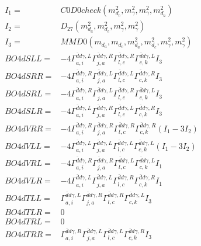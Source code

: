 \documentclass[A4,landscape]{article}
\begin{document}
\begin{align} 
I_1 = & C0D0check(m^2_{d_{{c}}}, m^2_{\gamma}, m^2_{\gamma}, m^2_{d_{{a}}}) \\ 
I_2 = & D_{27}(m^2_{d_{{a}}}, m^2_{d_{{c}}}, m^2_{\gamma}, m^2_{\gamma}) \\ 
I_3 = & MMD0(m_{d_{{a}}}, m_{d_{{c}}}, m^2_{d_{{a}}}, m^2_{d_{{c}}}, m^2_{\gamma}, m^2_{\gamma}) \\ 
  BO4dSLL= & -4  \Gamma^{\bar{d}d \gamma ,L}_{a, i} \Gamma^{\bar{d}d \gamma ,R}_{j, a} \Gamma^{\bar{d}d \gamma ,R}_{l, c} \Gamma^{\bar{d}d \gamma ,L}_{c, k} I_3 \\ 
  BO4dSRR= & -4  \Gamma^{\bar{d}d \gamma ,R}_{a, i} \Gamma^{\bar{d}d \gamma ,L}_{j, a} \Gamma^{\bar{d}d \gamma ,L}_{l, c} \Gamma^{\bar{d}d \gamma ,R}_{c, k} I_3 \\ 
  BO4dSRL= & -4  \Gamma^{\bar{d}d \gamma ,R}_{a, i} \Gamma^{\bar{d}d \gamma ,L}_{j, a} \Gamma^{\bar{d}d \gamma ,R}_{l, c} \Gamma^{\bar{d}d \gamma ,L}_{c, k} I_3 \\ 
  BO4dSLR= & -4  \Gamma^{\bar{d}d \gamma ,L}_{a, i} \Gamma^{\bar{d}d \gamma ,R}_{j, a} \Gamma^{\bar{d}d \gamma ,L}_{l, c} \Gamma^{\bar{d}d \gamma ,R}_{c, k} I_3 \\ 
  BO4dVRR= & -4  \Gamma^{\bar{d}d \gamma ,R}_{a, i} \Gamma^{\bar{d}d \gamma ,R}_{j, a} \Gamma^{\bar{d}d \gamma ,R}_{l, c} \Gamma^{\bar{d}d \gamma ,R}_{c, k} (I_1 - 3 I_2) \\ 
  BO4dVLL= & -4  \Gamma^{\bar{d}d \gamma ,L}_{a, i} \Gamma^{\bar{d}d \gamma ,L}_{j, a} \Gamma^{\bar{d}d \gamma ,L}_{l, c} \Gamma^{\bar{d}d \gamma ,L}_{c, k} (I_1 - 3 I_2) \\ 
  BO4dVRL= & -4  \Gamma^{\bar{d}d \gamma ,R}_{a, i} \Gamma^{\bar{d}d \gamma ,R}_{j, a} \Gamma^{\bar{d}d \gamma ,L}_{l, c} \Gamma^{\bar{d}d \gamma ,L}_{c, k} I_1 \\ 
  BO4dVLR= & -4  \Gamma^{\bar{d}d \gamma ,L}_{a, i} \Gamma^{\bar{d}d \gamma ,L}_{j, a} \Gamma^{\bar{d}d \gamma ,R}_{l, c} \Gamma^{\bar{d}d \gamma ,R}_{c, k} I_1 \\ 
  BO4dTLL= &  \Gamma^{\bar{d}d \gamma ,L}_{a, i} \Gamma^{\bar{d}d \gamma ,R}_{j, a} \Gamma^{\bar{d}d \gamma ,R}_{l, c} \Gamma^{\bar{d}d \gamma ,L}_{c, k} I_3 \\ 
  BO4dTLR= & 0 \\ 
  BO4dTRL= & 0 \\ 
  BO4dTRR= &  \Gamma^{\bar{d}d \gamma ,R}_{a, i} \Gamma^{\bar{d}d \gamma ,L}_{j, a} \Gamma^{\bar{d}d \gamma ,L}_{l, c} \Gamma^{\bar{d}d \gamma ,R}_{c, k} I_3 \\ 
\end{align} 
\end{document}
